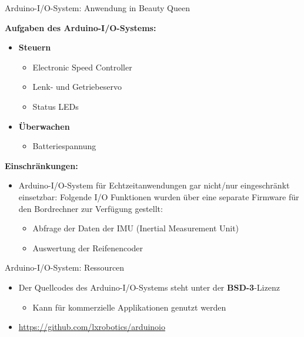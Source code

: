 \documentclass{beamer}
\begin{document}
\begin{frame}{Arduino-I/O-System: Anwendung in Beauty Queen}
\begin{large}\textbf{Aufgaben des Arduino-I/O-Systems:}\end{large}
 \begin{itemize}
  \item \textbf{Steuern}
  \begin{itemize}
   \item Electronic Speed Controller
   \item Lenk- und Getriebeservo
   \item Status LEDs
  \end{itemize}
 \end{itemize}
 \begin{itemize}
  \item \textbf{\"Uberwachen}
  \begin{itemize}
   \item Batteriespannung
  \end{itemize}
 \end{itemize}
\begin{large}\textbf{Einschr\"ankungen:}\end{large}
\begin{itemize}
 \item Arduino-I/O-System f\"ur Echtzeitanwendungen gar nicht/nur eingeschr\"ankt einsetzbar: Folgende I/O Funktionen wurden über eine separate Firmware f\"ur den Bordrechner zur Verf\"ugung gestellt:
 \begin{itemize}
  \item Abfrage der Daten der IMU (Inertial Measurement Unit)
  \item Auswertung der Reifenencoder
 \end{itemize}
\end{itemize}
\end{frame}
\begin{frame}{Arduino-I/O-System: Ressourcen}
	\begin{itemize}
		\item Der Quellcodes des Arduino-I/O-Systems steht unter der \textbf{BSD-3}-Lizenz
		\begin{itemize}
			\item Kann f\"ur kommerzielle Applikationen genutzt werden
		\end{itemize}
	\end{itemize}
	\begin{itemize}
		\item \url{https://github.com/lxrobotics/arduinoio}
	\end{itemize}
\end{frame}
\end{document}
